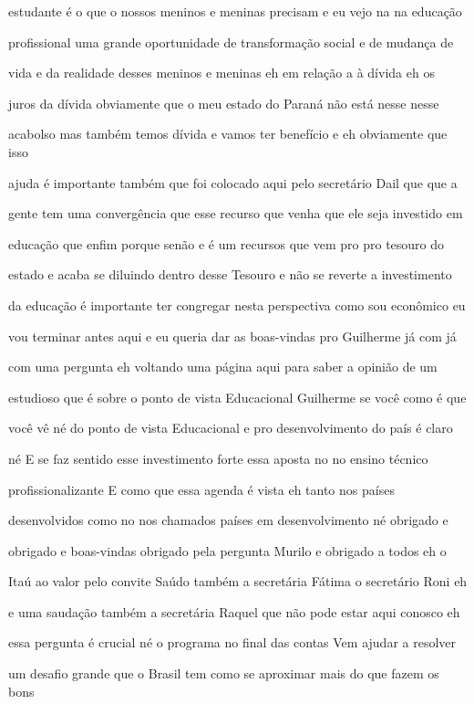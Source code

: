 \documentclass[a4paper,12pt]{article}
\begin{document}
estudante é o que o nossos meninos e meninas precisam e eu vejo na na educação

profissional uma grande oportunidade de transformação social e de mudança de

vida e da realidade desses meninos e meninas eh em relação a à dívida eh os

juros da dívida obviamente que o meu estado do Paraná não está nesse nesse

acabolso mas também temos dívida e vamos ter benefício e eh obviamente que isso

ajuda é importante também que foi colocado aqui pelo secretário Dail que que a

gente tem uma convergência que esse recurso que venha que ele seja investido em

educação que enfim porque senão e é um recursos que vem pro pro tesouro do

estado e acaba se diluindo dentro desse Tesouro e não se reverte a investimento

da educação é importante ter congregar nesta perspectiva como sou econômico eu

vou terminar antes aqui e eu queria dar as boas-vindas pro Guilherme já com já

com uma pergunta eh voltando uma página aqui para saber a opinião de um

estudioso que é sobre o ponto de vista Educacional Guilherme se você como é que

você vê né do ponto de vista Educacional e pro desenvolvimento do país é claro

né E se faz sentido esse investimento forte essa aposta no no ensino técnico

profissionalizante E como que essa agenda é vista eh tanto nos países

desenvolvidos como no nos chamados países em desenvolvimento né obrigado e

obrigado e boas-vindas obrigado pela pergunta Murilo e obrigado a todos eh o

Itaú ao valor pelo convite Saúdo também a secretária Fátima o secretário Roni eh

e uma saudação também a secretária Raquel que não pode estar aqui conosco eh

essa pergunta é crucial né o programa no final das contas Vem ajudar a resolver

um desafio grande que o Brasil tem como se aproximar mais do que fazem os bons
\end{document}
